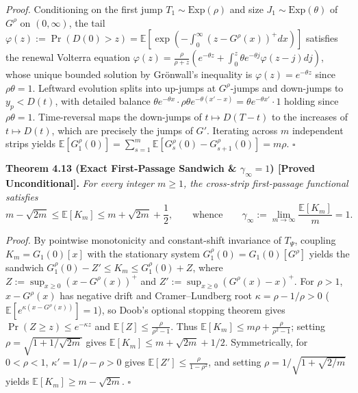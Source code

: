 \documentclass[
  11pt,
]{article}
\begin{document}
\emph{Proof.} Conditioning on the first jump \(T_1 \sim \mathrm{Exp}(\rho)\) and size \(J_1 \sim \mathrm{Exp}(\theta)\) of \(G^\rho\) on \((0, \infty)\), the tail \(\varphi(z) := \Pr(D(0) > z) = \mathbb{E}[\exp(-\int_0^\infty (z - G^\rho(x))^+ dx)]\) satisfies the renewal Volterra equation \(\varphi(z) = \frac{\rho}{\rho+z}(e^{-\theta z} + \int_0^z \theta e^{-\theta j}\varphi(z-j)dj)\), whose unique bounded solution by Grönwall's inequality is \(\varphi(z) = e^{-\theta z}\) since \(\rho\theta = 1\). Leftward evolution splits into up-jumps at \(G^\rho\)-jumps and down-jumps to \(y_p < D(t)\), with detailed balance \(\theta e^{-\theta x} \cdot \rho\theta e^{-\theta(x'-x)} = \theta e^{-\theta x'} \cdot 1\) holding since \(\rho\theta = 1\). Time-reversal maps the down-jumps of \(t \mapsto D(T-t)\) to the increases of \(t \mapsto D(t)\), which are precisely the jumps of \(G'\). Iterating across \(m\) independent strips yields \(\mathbb{E}[G^\rho_1(0)] = \sum_{s=1}^m \mathbb{E}[G^\rho_s(0) - G^\rho_{s+1}(0)] = m\rho\). \(\square\)

\textbf{Theorem 4.13 (Exact First-Passage Sandwich \& \(\gamma_\infty = 1\)) [Proved Unconditional].}
\emph{For every integer \(m \ge 1\), the cross-strip first-passage functional satisfies}
\begin{equation}
m - \sqrt{2m} \le \mathbb{E}[K_m] \le m + \sqrt{2m} + \frac{1}{2}, \qquad \text{whence} \qquad \gamma_\infty := \lim_{m \to \infty} \frac{\mathbb{E}[K_m]}{m} = 1.
\end{equation}

\emph{Proof.} By pointwise monotonicity and constant-shift invariance of \(T_\Psi\), coupling \(K_m = G_1(0)[x]\) with the stationary system \(G^\rho_1(0) = G_1(0)[G^\rho]\) yields the sandwich \(G^\rho_1(0) - Z' \le K_m \le G^\rho_1(0) + Z\), where \(Z := \sup_{x \ge 0}(x - G^\rho(x))^+\) and \(Z' := \sup_{x \ge 0}(G^\rho(x) - x)^+\). For \(\rho > 1\), \(x - G^\rho(x)\) has negative drift and Cramer--Lundberg root \(\kappa = \rho - 1/\rho > 0\) (\(\mathbb{E}[e^{\kappa(x - G^\rho(x))}] = 1\)), so Doob's optional stopping theorem gives \(\Pr(Z \ge z) \le e^{-\kappa z}\) and \(\mathbb{E}[Z] \le \frac{\rho}{\rho^2 - 1}\). Thus \(\mathbb{E}[K_m] \le m\rho + \frac{\rho}{\rho^2-1}\); setting \(\rho = \sqrt{1 + 1/\sqrt{2m}}\) gives \(\mathbb{E}[K_m] \le m + \sqrt{2m} + 1/2\). Symmetrically, for \(0 < \rho < 1\), \(\kappa' = 1/\rho - \rho > 0\) gives \(\mathbb{E}[Z'] \le \frac{\rho}{1 - \rho^2}\), and setting \(\rho = 1/\sqrt{1 + \sqrt{2/m}}\) yields \(\mathbb{E}[K_m] \ge m - \sqrt{2m}\). \(\square\)
\end{document}
